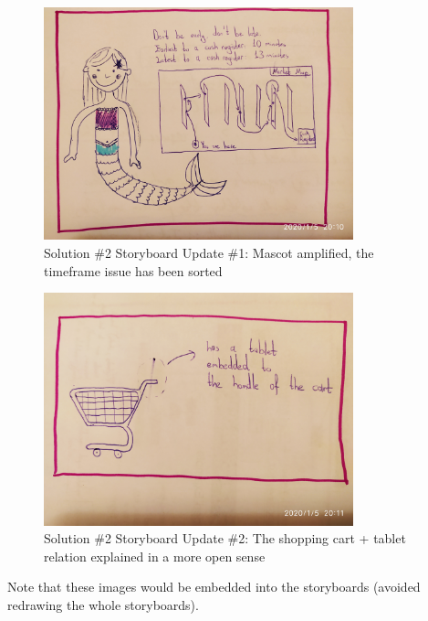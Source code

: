 \documentclass[a4paper,10pt,oneside]{scrreprt}
\begin{document}
\begin{figure}[H]
\centering
\includegraphics[width=0.8\textwidth, clip, trim={10em 8em 25em 0em}]{images/s2_p1.jpg}
\caption{Solution \#2 Storyboard Update \#1: \newline Mascot amplified, the timeframe issue has been sorted}
\end{figure}
\begin{figure}[H]
\centering
\includegraphics[width=0.8\textwidth, clip, trim={10em 50em 5em 20em}]{images/s2_p2.jpg}
\caption{Solution \#2 Storyboard Update \#2: \newline The shopping cart + tablet relation explained in a more open sense}
\end{figure}
\bigskip
\bigskip
Note that these images would be embedded into the storyboards (avoided redrawing the whole storyboards).
\end{document}
